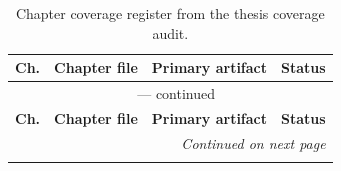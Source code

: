 \begin{small}
\begin{longtable}{@{}p{1.0cm}p{4.6cm}p{4.0cm}p{1.5cm}@{}}
\caption{Chapter coverage register from the thesis coverage audit.}
\label{tab:chapter-coverage-register} \\
\toprule
\textbf{Ch.} & \textbf{Chapter file} & \textbf{Primary artifact} & \textbf{Status} \\
\midrule
\endfirsthead

\multicolumn{4}{c}{\tablename\ \thetable{} --- continued} \\
\toprule
\textbf{Ch.} & \textbf{Chapter file} & \textbf{Primary artifact} & \textbf{Status} \\
\midrule
\endhead

\midrule
\multicolumn{4}{r}{\textit{Continued on next page}} \\
\endfoot

\bottomrule
\endlastfoot


\end{longtable}
\end{small}
